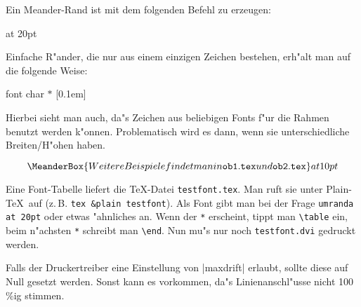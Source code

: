 Ein Meander-Rand ist mit dem folgenden Befehl zu erzeugen:
\begin{bsp}
 at 20pt
\end{bsp}
\make

Einfache R"ander, die nur aus einem einzigen Zeichen bestehen, erh"alt man
auf die folgende Weise:
\begin{bsp}
             font {\Large}
			 char {$\ast$} [0.1em]
\end{bsp}
\make
Hierbei sieht man auch, da"s Zeichen aus beliebigen Fonts f"ur die Rahmen
benutzt werden k"onnen. Problematisch wird es dann, wenn sie
unterschiedliche Breiten/H"ohen haben.

\[ \MeanderBox {Weitere Beispiele findet man in
               {\tt ob1.tex} und {\tt ob2.tex}} at 10pt \]

Eine Font-Tabelle liefert die \TeX-Datei \verb|testfont.tex|. Man ruft sie
unter {\sc Plain}-\TeX\ auf (z.\,B. \verb|tex &plain testfont|). Als Font
gibt man bei der Frage \verb|umranda at 20pt| oder etwas "ahnliches an.
Wenn der \verb|*| erscheint, tippt man \verb|\table| ein, beim n"achsten
\verb|*| schreibt man \verb|\end|. Nun mu"s nur noch \verb|testfont.dvi|
gedruckt werden.

Falls der Druckertreiber eine Einstellung von |maxdrift| erlaubt, sollte
diese auf Null gesetzt werden. Sonst kann es vorkommen, da"s
Linienanschl"usse nicht 100\,\%ig stimmen.






